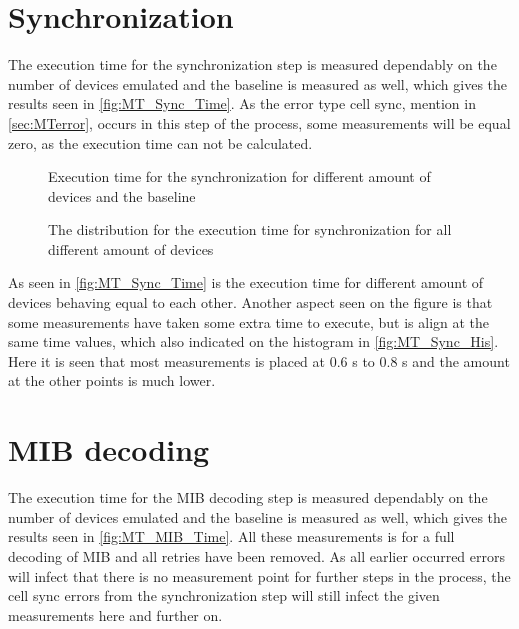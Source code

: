 \section{Synchronization}
The execution time for the synchronization step is measured dependably on the number of devices emulated and the baseline is measured as well, which gives the results seen in \autoref{fig:MT_Sync_Time}. As the error type cell sync, mention in \autoref{sec:MTerror}, occurs in this step of the process, some measurements will be equal zero, as the execution time can not be calculated.

\begin{minipage}{0.48\textwidth}
\begin{figure}[H]
\centering
\resizebox{0.9\textwidth}{!}{
}
\caption{Execution time for the synchronization for different amount of devices and the baseline}
\label{fig:MT_Sync_Time}
\end{figure}
\end{minipage}%
\hfill
\begin{minipage}{0.48\textwidth}
\begin{figure}[H]
\centering
\resizebox{0.9\textwidth}{!}{
}
\caption{The distribution for the execution time for synchronization for all different amount of devices}
\label{fig:MT_Sync_His}
\end{figure}
\end{minipage}

As seen in \autoref{fig:MT_Sync_Time} is the execution time for different amount of devices behaving equal to each other. Another aspect seen on the figure is that some measurements have taken some extra time to execute, but is align at the same time values, which also indicated on the histogram in \autoref{fig:MT_Sync_His}. Here it is seen that most measurements is placed at 0.6 s to 0.8 s and the amount at the other points is much lower.



\section{MIB decoding}
The execution time for the MIB decoding step is measured dependably on the number of devices emulated and the baseline is measured as well, which gives the results seen in \autoref{fig:MT_MIB_Time}. All these measurements is for a full decoding of MIB and all retries have been removed.
As all earlier occurred errors will infect that there is no measurement point for further steps in the process, the cell sync errors from the synchronization step will still infect the given measurements here and further on.

